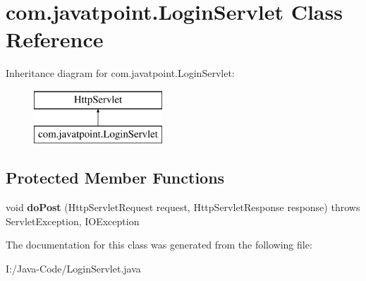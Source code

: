 \hypertarget{classcom_1_1javatpoint_1_1_login_servlet}{}\section{com.\+javatpoint.\+Login\+Servlet Class Reference}
\label{classcom_1_1javatpoint_1_1_login_servlet}
Inheritance diagram for com.\+javatpoint.\+Login\+Servlet\+:\begin{figure}[H]
\begin{center}
\leavevmode
\includegraphics[height=2.000000cm]{classcom_1_1javatpoint_1_1_login_servlet}
\end{center}
\end{figure}
\subsection*{Protected Member Functions}
\begin{DoxyCompactItemize}
\item 
\mbox{\label{classcom_1_1javatpoint_1_1_login_servlet_aa80fe98cddb29a94d3fd41d3dda5567b}} 
void {\bfseries do\+Post} (Http\+Servlet\+Request request, Http\+Servlet\+Response response)  throws Servlet\+Exception, I\+O\+Exception 
\end{DoxyCompactItemize}


The documentation for this class was generated from the following file\+:\begin{DoxyCompactItemize}
\item 
I\+:/\+Java-\/\+Code/Login\+Servlet.\+java\end{DoxyCompactItemize}
